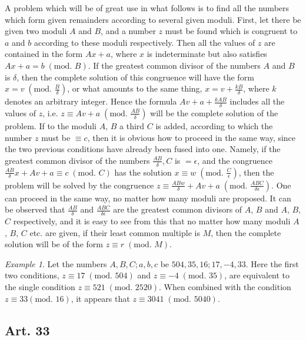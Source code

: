 \documentclass{book}
\theoremstyle{plain}
\theoremstyle{remark}
\newtheorem*{example}{Example}
\begin{document}
A problem which will be of great use in what follows is to find all the numbers which form given remainders according to several given moduli.  First, let there be given two moduli $A$ and $B$, and a number $z$ must be found which is congruent to $a$ and $b$ according to these moduli respectively.  Then all the values of $z$ are contained in the form $Ax + a$, where $x$ is indeterminate but also satisfies $Ax + a = b \;(\textrm{mod. }B)$.  If the greatest common divisor of the numbers $A$ and $B$ is $\delta$, then the complete solution of this congruence will have the form $x=v \;(\textrm{mod. }\frac{B}{\delta})$, or what amounts to the same thing, $x=v+\frac{kB}{\delta}$, where $k$ denotes an arbitrary integer.   Hence the formula $Av + a + \frac{kAB}{\delta}$ includes all the values of $z$, i.e. $z \equiv Av + a \; (\textrm{mod. }\frac{AB}{\delta})$ will be the complete solution of the problem.  If to the moduli $A$, $B$ a third $C$ is added, according to which the number $z$ must be $\equiv c$, then it is obvious how to proceed in the same way, since the two previous conditions have already been fused into one.  Namely, if the greatest common divisor of the numbers $\frac{AB}{\delta},  C$ is $=\epsilon$, and the congruence $\frac{AB}{\delta}x + Av + a \equiv c\;(\textrm{mod. }C)$ has the solution $x \equiv w \;(\textrm{mod. }\frac{C}{\epsilon})$, then the problem will be solved by the congruence $z \equiv \frac{ABw}{\delta} + Av + a \;(\textrm{mod. }\frac{ABC}{\delta \epsilon})$.  One can proceed in the same way, no matter how many moduli are proposed.  It can be observed that $\frac{AB}{\delta}$ and $\frac{ABC}{\delta \epsilon}$ are the greatest common divisors of $A$, $B$ and $A$, $B$, $C$ respectively, and it is easy to see from this that no matter how many moduli $A$, $B$, $C$ etc. are given, if their least common multiple is $M$, then the complete solution will be of the form $z \equiv r \;(\textrm{mod. } M)$.

\begin{example} Let the numbers $A,B,C;a,b,c$ be $504,35,16;17,-4,33$.  Here the first two conditions, $z \equiv 17\;(\textrm{mod. }504)$ and $z \equiv -4 \;(\textrm{mod. }35)$, are equivalent to the single condition $z \equiv 521\;(\textrm{mod. }2520)$.   When combined with the condition $z \equiv 33(\textrm{mod. } 16)$, it appears that $z \equiv 3041\;(\textrm{mod. }5040)$. \end{example}

\subsection*{Art. 33} 
\end{document}
